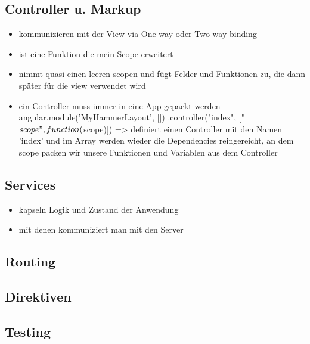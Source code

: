 \subsection{Controller u. Markup}
\begin{itemize}
  \item kommunizieren mit der View via One-way oder Two-way binding
  \item ist eine Funktion die mein Scope erweitert
  \item nimmt quasi einen leeren scopen und fügt Felder und Funktionen zu, die dann später für die view verwendet wird
  \item ein Controller muss immer in eine App gepackt werden
  angular.module('MyHammerLayout', [])
    .controller("index", ["$scope", function($scope)]) => definiert einen Controller mit den Namen 'index' und im Array
    werden wieder die Dependencies reingereicht, an dem scope packen wir unsere Funktionen und Variablen aus dem
    Controller
\end{itemize}


\subsection{Services}
\begin{itemize}
  \item kapseln Logik und Zustand der Anwendung
  \item mit denen kommuniziert man mit den Server
\end{itemize}  


\subsection{Routing}

\subsection{Direktiven}

\subsection{Testing}


